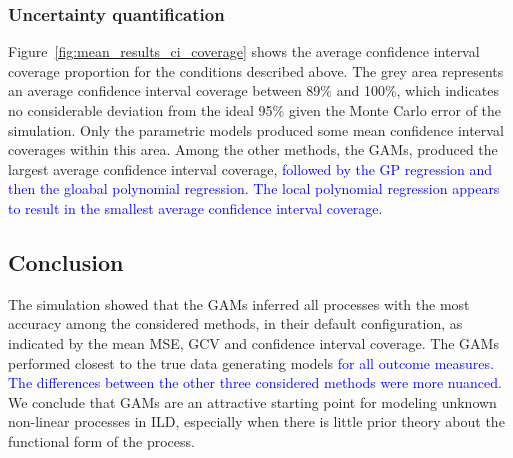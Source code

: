 \documentclass[man, floatsintext]{apa7}
\begin{document}
\subsubsection{Uncertainty quantification}

Figure~\ref{fig:mean_results_ci_coverage} shows the average confidence interval
coverage proportion for the conditions described above. The grey area
represents an average confidence interval coverage between 89\% and 100\%,
which indicates no considerable deviation from the ideal 95\% given the Monte
Carlo error of the simulation. Only the parametric models produced some mean
confidence interval coverages within this area. Among the other methods, the
GAMs, produced the largest average confidence interval coverage,
\textcolor{blue}{followed by the GP regression and then the gloabal polynomial
  regression. The local polynomial regression appears to result in the smallest
  average confidence interval coverage.}

\begin{sidewaysfigure*}[htbp]
  \caption{Average confidence interval coverage across all processes, analysis
    methods, and simulation conditions}
  \label{fig:mean_results_ci_coverage}
\end{sidewaysfigure*}

\subsection{Conclusion}

The simulation showed that the GAMs inferred all processes with the most
accuracy among the considered methods, in their default configuration, as
indicated by the mean MSE, GCV and confidence interval coverage. The GAMs
performed closest to the true data generating models \textcolor{blue}{for all
  outcome measures. The differences between the other three considered methods
  were more nuanced.} We conclude that GAMs are an attractive starting point
for
modeling unknown non-linear processes in ILD, especially when there is little
prior theory about the functional form of the process.
\end{document}
